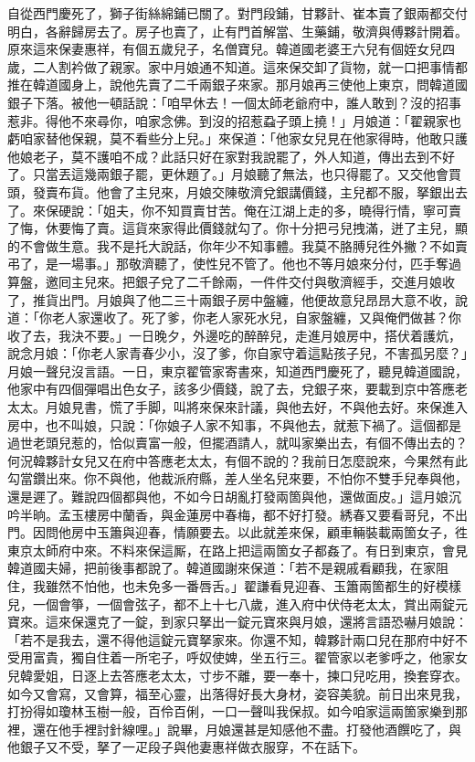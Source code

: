 自從西門慶死了，獅子街絲綿鋪已關了。對門段鋪，甘夥計、崔本賣了銀兩都交付明白，各辭歸房去了。房子也賣了，止有門首解當、生藥鋪，敬濟與傅夥計開着。原來這來保妻惠祥，有個五歲兒子，名僧寶兒。韓道國老婆王六兒有個姪女兒四歲，二人割衿做了親家。家中月娘通不知道。這來保交卸了貨物，就一口把事情都推在韓道國身上，說他先賣了二千兩銀子來家。{}那月娘再三使他上東京，問韓道國銀子下落。被他一頓話說：「咱早休去！一個太師老爺府中，誰人敢到？沒的招事惹非。得他不來尋你，咱家念佛。到沒的招惹蝨子頭上撓！」月娘道：「翟親家也虧咱家替他保親，莫不看些分上兒。」來保道：「他家女兒見在他家得時，他敢只護他娘老子，莫不護咱不成？{}此話只好在家對我說罷了，外人知道，傳出去到不好了。只當丟這幾兩銀子罷，更休題了。」月娘聽了無法，也只得罷了。又交他會買頭，發賣布貨。他會了主兒來，月娘交陳敬濟兌銀講價錢，主兒都不服，拏銀出去了。來保硬說：「姐夫，你不知買賣甘苦。俺在江湖上走的多，曉得行情，寧可賣了悔，休要悔了賣。這貨來家得此價錢就勾了。你十分把弓兒拽滿，迸了主兒，顯的不會做生意。我不是托大說話，你年少不知事體。我莫不胳膊兒徃外撇？不如賣弔了，是一場事。」那敬濟聽了，使性兒不管了。他也不等月娘來分付，匹手奪過算盤，邀囘主兒來。把銀子兌了二千餘兩，一件件交付與敬濟經手，交進月娘收了，推貨出門。月娘與了他二三十兩銀子房中盤纏，他便故意兒昂昂大意不收，說道：「你老人家還收了。死了爹，你老人家死水兒，自家盤纏，又與俺們做甚？你收了去，我決不要。」一日晚夕，外邊吃的醉醉兒，走進月娘房中，搭伏着護炕，說念月娘：「你老人家青春少小，沒了爹，你自家守着這點孩子兒，不害孤另麼？」月娘一聲兒沒言語。{}一日，東京翟管家寄書來，知道西門慶死了，聽見韓道國說，他家中有四個彈唱出色女子，該多少價錢，說了去，兌銀子來，要載到京中答應老太太。月娘見書，慌了手脚，叫將來保來計議，與他去好，不與他去好。來保進入房中，也不叫娘，只說：「你娘子人家不知事，不與他去，就惹下禍了。這個都是過世老頭兒惹的，恰似賣富一般，但擺酒請人，就叫家樂出去，有個不傳出去的？何況韓夥計女兒又在府中答應老太太，有個不說的？我前日怎麼說來，今果然有此勾當鑽出來。{}你不與他，他裁派府縣，差人坐名兒來要，不怕你不雙手兒奉與他，還是遲了。難說四個都與他，不如今日胡亂打發兩箇與他，還做面皮。」這月娘沉吟半晌。孟玉樓房中蘭香，與金蓮房中春梅，都不好打發。綉春又要看哥兒，不出門。因問他房中玉簫與迎春，情願要去。以此就差來保，顧車輛裝載兩箇女子，徃東京太師府中來。不料來保這厮，在路上把這兩箇女子都姦了。有日到東京，會見韓道國夫婦，把前後事都說了。韓道國謝來保道：「若不是親戚看顧我，在家阻住，我雖然不怕他，也未免多一番唇舌。」翟謙看見迎春、玉簫兩箇都生的好模樣兒，一個會箏，一個會弦子，都不上十七八歲，進入府中伏侍老太太，賞出兩錠元寶來。這來保還克了一錠，到家只拏出一錠元寶來與月娘，還將言語恐嚇月娘說：「若不是我去，還不得他這錠元寶拏家來。你還不知，韓夥計兩口兒在那府中好不受用富貴，獨自住着一所宅子，呼奴使婢，坐五行三。翟管家以老爹呼之，他家女兒韓愛姐，日逐上去答應老太太，寸步不離，要一奉十，揀口兒吃用，換套穿衣。如今又會寫，又會算，福至心靈，出落得好長大身材，姿容美貌。前日出來見我，打扮得如瓊林玉樹一般，百伶百俐，一口一聲叫我保叔。如今咱家這兩箇家樂到那裡，還在他手裡討針線哩。」說畢，月娘還甚是知感他不盡。{}打發他酒饌吃了，與他銀子又不受，拏了一疋段子與他妻惠祥做衣服穿，不在話下。

